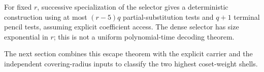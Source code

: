 For fixed \(r\), successive specialization of the selector gives a
deterministic construction using at most \((r-5)q\) partial-substitution
tests and \(q+1\) terminal pencil tests, assuming explicit coefficient access.
The dense selector has size exponential in \(r\); this is not a uniform
polynomial-time decoding theorem.

The next section combines this escape theorem with the explicit carrier and
the independent covering-radius inputs to classify the two highest coset-weight
shells.
